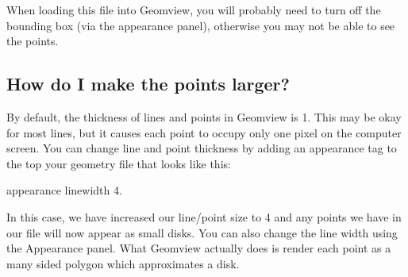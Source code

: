 \documentclass[12pt,a4paper]{article}
\begin{document}
        When loading this file into Geomview, you will probably need to turn off
        the bounding box (via the appearance panel), otherwise you may not be
        able to see the points.

    \subsection{How do I make the points larger?}

        By default, the thickness of lines and points in Geomview is 1. This may
        be okay for most lines, but it causes each point to occupy only one
        pixel on the computer screen. You can change line and point thickness by
        adding an appearance tag to the top your geometry file that looks like
        this:

        appearance {
            linewidth 4.
        }

        In this case, we have increased our line/point size to 4 and any points
        we have in our file will now appear as small disks. You can also change
        the line width using the Appearance panel. What Geomview actually does
        is render each point as a many sided polygon which approximates a disk.
\end{document}
